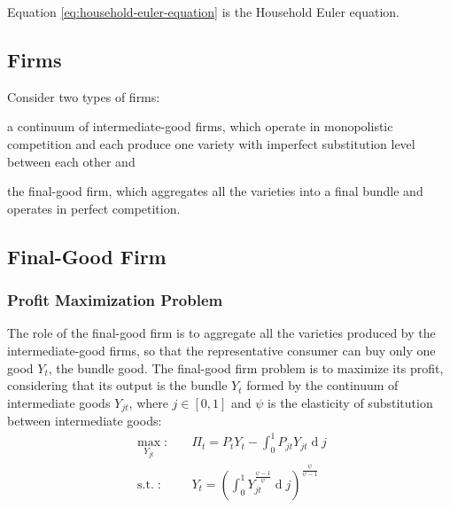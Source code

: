 \documentclass[
	12pt, 
	]{article}
\numberwithin{equation}{section}
\DeclareMathOperator{\dif}{d}
\DeclareMathOperator{\st}{s.t.}
\theoremstyle{definition}
\theoremstyle{plain}
\theoremstyle{plain}
\theoremstyle{plain}
\begin{document}
Equation \ref{eq:household-euler-equation} is the Household Euler equation.


\subsection*{Firms}

Consider two types of firms: 
\begin{enumerate*}[label=(\arabic*)]
	\item a continuum of intermediate-good firms, which operate in monopolistic competition and each produce one variety with imperfect substitution level between each other and
	
	\item the final-good firm, which aggregates all the varieties into a final bundle and operates in perfect competition.
\end{enumerate*}


\subsection{Final-Good Firm}

\subsubsection*{Profit Maximization Problem}

The role of the final-good firm is to aggregate all the varieties produced by the intermediate-good firms, so that the representative consumer can buy only one good $Y_t$, the bundle good. The final-good firm problem is to maximize its profit, considering that its output is the bundle $Y_t$ formed by the continuum of intermediate goods $Y_{jt}$, where $j \in [0,1]$ and $\psi$ is the elasticity of substitution between intermediate goods:
\begin{align}
\label{eq:final-good-firm-max-problem}
	\max_{Y_{jt}}: &\quad \Pi_t = P_t Y_t - \int_{0}^{1} P_{jt} Y_{jt} \dif j\\
\label{eq:final-good-firm-bundle-rule}
	\st: & \quad Y_t = \left( \int_{0}^{1} Y_{jt}^{\frac{\psi-1}{\psi}} \dif j \right)^{\frac{\psi}{\psi-1}}
\end{align}
\end{document}
